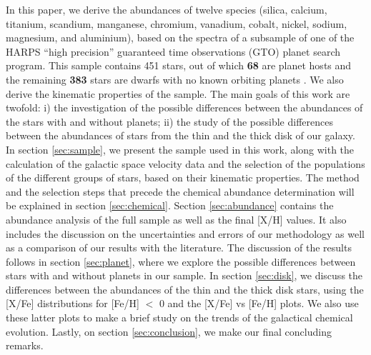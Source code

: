 \documentclass[oldversion]{aa}
\begin{document}
In this paper, we derive the abundances of twelve species (silica, calcium, titanium, scandium, manganese, chromium, vanadium, cobalt, nickel, sodium, magnesium, and aluminium), based on the spectra of a subsample of one of the HARPS ``high precision'' guaranteed time observations (GTO) planet search program. This sample contains 451 stars, out of which \textbf{68} are planet hosts and the remaining \textbf{383} stars are dwarfs with no known orbiting planets \citep{Sousa-2008}. We also derive the kinematic properties of the sample. The main goals of this work are twofold: i) the investigation of the possible differences between the abundances of the stars with and without planets; ii) the study of the possible differences between the abundances of stars from the thin and the thick disk of our galaxy. In section \ref{sec:sample}, we present the sample used in this work, along with the calculation of the galactic space velocity data and the selection of the populations of the different groups of stars, based on their kinematic properties. The method and the selection steps that precede the chemical abundance determination will be explained in section \ref{sec:chemical}. Section \ref{sec:abundance} contains the abundance analysis of the full sample as well as the final [X/H] values. It also includes the discussion on the uncertainties and errors of our methodology as well as a comparison of our results with the literature. The discussion of the results follows in section \ref{sec:planet}, where we explore the possible differences between stars with and without planets in our sample.  %
In section \ref{sec:disk}, we discuss the differences between the abundances of the thin and the thick disk stars, using the [X/Fe] distributions for [Fe/H] $<$ 0 and the [X/Fe] vs [Fe/H] plots. We also use these latter plots to make a brief study on the trends of the galactical chemical evolution. Lastly, on section \ref{sec:conclusion}, we make our final concluding remarks.

\end{document}
